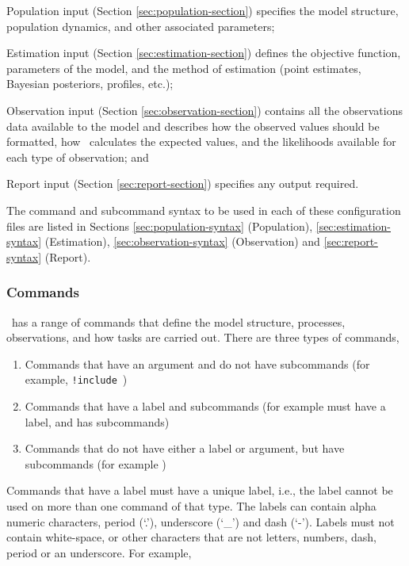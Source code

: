 \begin{description}

\item Population input (Section \ref{sec:population-section}) specifies the model structure, population dynamics, and other associated parameters;
\item Estimation input (Section \ref{sec:estimation-section}) defines the objective function, parameters of the model, and the method of estimation (point estimates, Bayesian posteriors, profiles, etc.);
\item Observation input (Section \ref{sec:observation-section}) contains all the observations data available to the model and  describes how the observed values should be formatted, how \CNAME\ calculates the expected values, and the likelihoods available for each type of observation; and
\item Report input (Section \ref{sec:report-section}) specifies any output required.
\end{description}

The command and subcommand syntax to be used in each of these configuration files are listed in Sections \ref{sec:population-syntax} (Population), \ref{sec:estimation-syntax} (Estimation), \ref{sec:observation-syntax} (Observation) and \ref{sec:report-syntax} (Report).

\subsubsection{Commands}

\CNAME\ has a range of commands that define the model structure, processes, observations, and how tasks are carried out. There are three types of commands, 

\begin{enumerate}
\item Commands that have an argument and do not have subcommands (for example, \texttt{!include}\ )
\item Commands that have a label and subcommands (for example  must have a label, and has subcommands)
\item Commands that do not have either a label or argument, but have subcommands (for example )
\end{enumerate}

Commands that have a label must have a unique label, i.e., the label cannot be used on more than one command of that type. The labels can contain alpha numeric characters, period (`.'), underscore (`\_') and dash (`-'). Labels must not contain white-space, or other characters that are not letters, numbers, dash, period or an underscore. For example,

